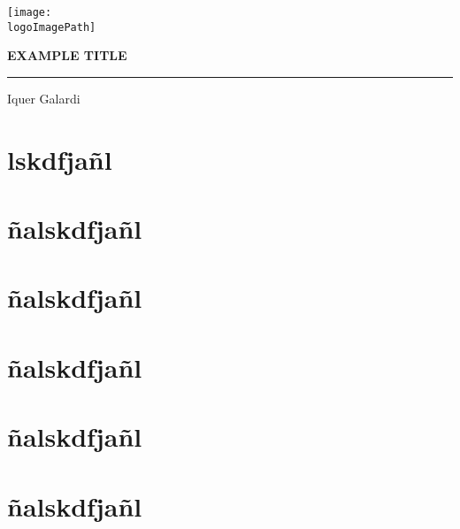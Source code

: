 \documentclass{report}
\newcommand{\logoImagePath}{templateImages/logo.png}
\newcommand{\projectName}{EXAMPLE TITLE}
\newcommand{\projectAuthorName}{Iquer Galardi}
\newcommand{\newChapter}[1]{\newpage \section{#1}}
\begin{document}
    \begin{titlepage}
        \begin{center}
            \texttt{[image: \\logoImagePath]}
            
            \Huge{\textbf{\projectName}}
        \end{center}
        
        \hrule

        \vspace{8cm}
        \begin{flushright}
            \LARGE \projectAuthorName\\
        \end{flushright}
    \end{titlepage}
    \newpage

    \tableofcontents
    \newpage

    \newChapter{lskdfjañl}
    \newChapter{ñalskdfjañl}
    \newChapter{ñalskdfjañl}
    \newChapter{ñalskdfjañl}
    \newChapter{ñalskdfjañl}
    \newChapter{ñalskdfjañl}
\end{document}
